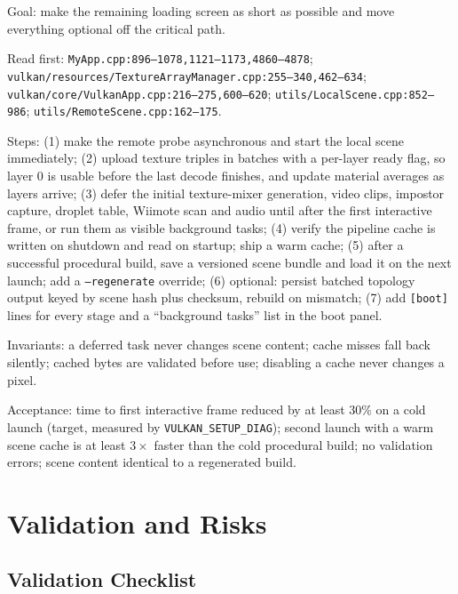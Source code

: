 \documentclass[11pt,a4paper]{article}
\begin{document}
\begin{tcolorbox}[promptbox={Prompt 5 --- Defer, cache, and progressive assets}]
Goal: make the remaining loading screen as short as possible and move
everything optional off the critical path.

Read first: \texttt{MyApp.cpp:896--1078,1121--1173,4860--4878};
\texttt{vulkan/resources/TextureArrayManager.cpp:255--340,462--634};
\texttt{vulkan/core/VulkanApp.cpp:216--275,600--620};
\texttt{utils/LocalScene.cpp:852--986}; \texttt{utils/RemoteScene.cpp:162--175}.

Steps: (1) make the remote probe asynchronous and start the local scene
immediately; (2) upload texture triples in batches with a per-layer ready
flag, so layer 0 is usable before the last decode finishes, and update
material averages as layers arrive; (3) defer the initial texture-mixer
generation, video clips, impostor capture, droplet table, Wiimote scan and
audio until after the first interactive frame, or run them as visible
background tasks; (4) verify the pipeline cache is written on shutdown and
read on startup; ship a warm cache; (5) after a successful procedural build,
save a versioned scene bundle and load it on the next launch; add a
\texttt{--regenerate} override; (6) optional: persist batched topology output
keyed by scene hash plus checksum, rebuild on mismatch; (7) add
\texttt{[boot]} lines for every stage and a ``background tasks'' list in the
boot panel.

Invariants: a deferred task never changes scene content; cache misses fall
back silently; cached bytes are validated before use; disabling a cache never
changes a pixel.

Acceptance: time to first interactive frame reduced by at least 30\% on a
cold launch (target, measured by \texttt{VULKAN\_SETUP\_DIAG}); second launch
with a warm scene cache is at least $3\times$ faster than the cold procedural
build; no validation errors; scene content identical to a regenerated build.
\end{tcolorbox}

\section{Validation and Risks}

\subsection{Validation Checklist}
\end{document}
